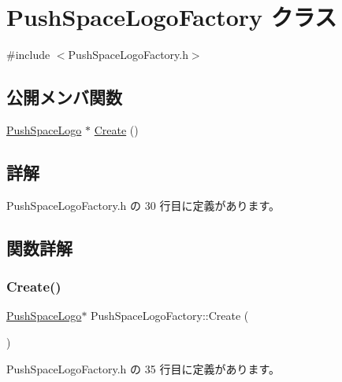 \hypertarget{class_push_space_logo_factory}{}\section{Push\+Space\+Logo\+Factory クラス}
\label{class_push_space_logo_factory}


{\ttfamily \#include $<$Push\+Space\+Logo\+Factory.\+h$>$}

\subsection*{公開メンバ関数}
\begin{DoxyCompactItemize}
\item 
\mbox{\hyperlink{class_push_space_logo}{Push\+Space\+Logo}} $\ast$ \mbox{\hyperlink{class_push_space_logo_factory_a40ed4a7781d8f5a6e802b90f3aa599cb}{Create}} ()
\end{DoxyCompactItemize}


\subsection{詳解}


 Push\+Space\+Logo\+Factory.\+h の 30 行目に定義があります。



\subsection{関数詳解}
\mbox{\label{class_push_space_logo_factory_a40ed4a7781d8f5a6e802b90f3aa599cb}} 
\subsubsection{\texorpdfstring{Create()}{Create()}}
{\footnotesize\ttfamily \mbox{\hyperlink{class_push_space_logo}{Push\+Space\+Logo}}$\ast$ Push\+Space\+Logo\+Factory\+::\+Create (\begin{DoxyParamCaption}{ }\end{DoxyParamCaption})\hspace{0.3cm}{\ttfamily [inline]}}



 Push\+Space\+Logo\+Factory.\+h の 35 行目に定義があります。


